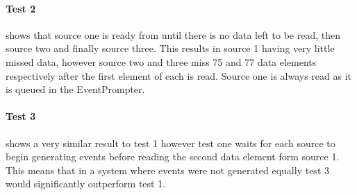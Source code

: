 \paragraph{Test 2} shows that source one is ready from until there is no data left to be read, then source two and finally source three.  This results in source 1 having very little missed data, however source two and three miss 75 and 77 data elements respectively after the first element of each is read.  Source one is always read as it is queued in the EventPrompter.

\paragraph{Test 3} shows a very similar result to test 1 however test one waits for each source to begin generating events before reading the second data element form source 1.  This means that in a system where events were not generated equally test 3 would significantly outperform test 1.
